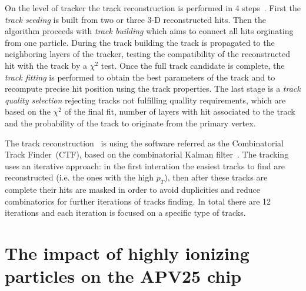 
On the level of tracker the track reconstruction is performed in 4 steps~\cite{website:slidesTracking, website:twikiTracking}. First the \textit{track seeding} is built from two or three 3-D reconstructed hits. Then the algorithm proceeds with \textit{track building} which aims to connect all hits orginating from one particle. During the track building the track is propagated to the neighboring layers of the tracker, testing the compatibility of the reconstructed hit with the track by a $\chi^{2}$ test. Once the full track candidate is complete, the \textit{track fitting} is performed to obtain the best parameters of the track and to recompute precise hit position using the track properties. The last stage is a \textit{track quality selection} rejecting tracks not fulfilling quallity requirements, which are based on the $\chi^{2}$ of the final fit, number of layers with hit associated to the track and the probability of the track  to originate from the primary vertex.

The track reconstruction~\cite{Chatrchyan:2014fea} is using the software referred as the Combinatorial Track Finder~(CTF), based on the combinatorial Kalman filter~\cite{Fruhwirth:1987fm}. The tracking uses an iterative approach: in the first interation the easiest tracks to find are reconstructed (i.e. the ones with the high $p_{T}$), then after these tracks are complete their hits are masked in order to avoid duplicities and reduce combinatorics for further iterations of tracks finding. In total there are 12 iterations and each iteration is focused on a specific type of tracks.


\section{The impact of highly ionizing particles on the APV25 chip}


